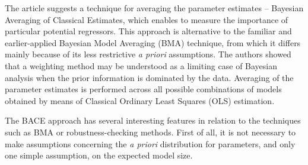 The article \cite{SalaMartinDoppelhoferMiller_BACE} suggests a
technique for averaging the parameter estimates -- Bayesian Averaging
of Classical Estimates, which enables to measure the importance of
particular potential regressors. This approach is alternative to the
familiar and earlier-applied Bayesian Model Averaging (BMA) technique,
from which it differs mainly because of its less restrictive \textit{a
  priori} assumptions. The authors showed that a weighting method may
be understood as a limiting case of Bayesian analysis when the prior
information is dominated by the data. Averaging of the parameter
estimates is performed across all possible combinations of models
obtained by means of Classical Ordinary Least Squares (OLS)
estimation.

The BACE approach has several interesting features in relation to
the techniques such as BMA or robustness-checking methods.
First of all, it is not necessary to make assumptions concerning
the \textit{a priori} distribution for parameters, and only
one simple assumption, on the expected model size.

% 
% 
% 
% 

